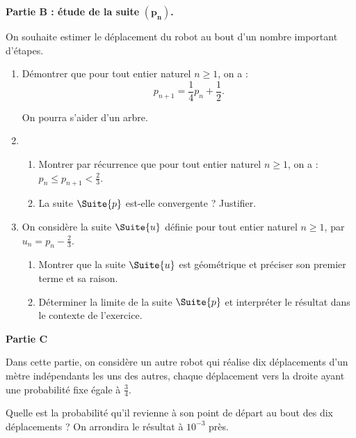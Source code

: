 \begin{Centrage}
	\textbf{Partie B : étude de la suite} $\bm{\left(p_n\right)}$\textbf{.}
\end{Centrage}

On souhaite estimer le déplacement du robot au bout d'un nombre important d'étapes.

\begin{enumerate}
	\item Démontrer que pour tout entier naturel $n \geqslant 1$, on a : \[ p_{n+1} = \frac{1}{4} p_n + \frac{1}{2}. \]
	
	On pourra s'aider d'un arbre.
	\item 
	\begin{enumerate}
		\item Montrer par récurrence que pour tout entier naturel $n \geqslant 1$, on a : $p_n \leqslant p_{n+1} < \frac{2}{3}$.
		\item La suite $\Suite{p}$ est-elle convergente ? Justifier.
	\end{enumerate}
	\item On considère la suite $\Suite{u}$ définie pour tout entier naturel $n \geq 1$, par $u_n = p_n - \frac{2}{3}$.
	\begin{enumerate}
		\item Montrer que la suite $\Suite{u}$ est géométrique et préciser son premier terme et sa raison.
		\item Déterminer la limite de la suite $\Suite{p}$ et interpréter le résultat dans le contexte de l'exercice.
	\end{enumerate}
\end{enumerate}

\begin{Centrage}
	\textbf{Partie C}
\end{Centrage}

Dans cette partie, on considère un autre robot qui réalise dix déplacements d'un mètre indépendants les uns des autres, chaque déplacement vers la droite ayant une probabilité fixe égale à $\frac{3}{4}$.

Quelle est la probabilité qu'il revienne à son point de départ au bout des dix déplacements ? On arrondira le résultat à $10^{-3}$ près.